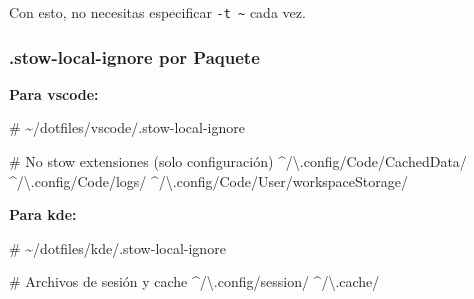 \documentclass[
  doc,
  floatsintext,
  longtable,
  a4paper,
  nolmodern,
  notxfonts,
  notimes,
  12pt,
  colorlinks=true,linkcolor=blue,citecolor=blue,urlcolor=blue]{apa7}
\newenvironment{Shaded}{\begin{snugshade}}{\end{snugshade}}
\newcommand{\CommentTok}[1]{\textcolor[rgb]{0.37,0.37,0.37}{#1}}
\newcommand{\ExtensionTok}[1]{\textcolor[rgb]{0.00,0.23,0.31}{#1}}
\newcommand{\StringTok}[1]{\textcolor[rgb]{0.13,0.47,0.30}{#1}}
\newcommand{\VariableTok}[1]{\textcolor[rgb]{0.07,0.07,0.07}{#1}}
\begin{document}
\begin{Shaded}
\end{Shaded}

Con esto, no necesitas especificar \texttt{-t\ \textasciitilde{}} cada
vez.

\subsubsection{.stow-local-ignore por
Paquete}\label{stow-local-ignore-por-paquete}

\textbf{Para vscode:}

\begin{Shaded}
\begin{Highlighting}[]
\CommentTok{\# \textasciitilde{}/dotfiles/vscode/.stow{-}local{-}ignore}

\CommentTok{\# No stow extensiones (solo configuración)}
\ExtensionTok{\^{}/\textbackslash{}.config/Code/CachedData/}
\ExtensionTok{\^{}/\textbackslash{}.config/Code/logs/}
\ExtensionTok{\^{}/\textbackslash{}.config/Code/User/workspaceStorage/}
\end{Highlighting}
\end{Shaded}

\textbf{Para kde:}

\begin{Shaded}
\begin{Highlighting}[]
\CommentTok{\# \textasciitilde{}/dotfiles/kde/.stow{-}local{-}ignore}

\CommentTok{\# Archivos de sesión y cache}
\ExtensionTok{\^{}/\textbackslash{}.config/session/}
\ExtensionTok{\^{}/\textbackslash{}.cache/}
\end{Highlighting}
\end{Shaded}
\end{document}
